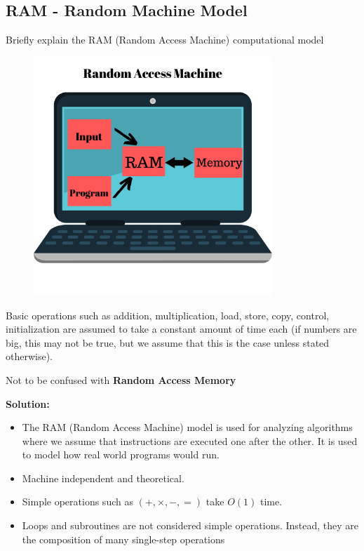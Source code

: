 \documentclass[11pt,fleqn]{book}
\begin{document}
\subsection{RAM - Random Machine Model}
\vspace{1em}
\begin{example}
Briefly explain the RAM (Random Access Machine) computational model
\end{example}
\begin{figure}[H]
    \centering
    \includegraphics[width=90mm]{Pictures/RAM_1.pdf}
\end{figure}
\vspace{1em} 
\begin{definition}
Basic operations such as addition, multiplication, load, store,
copy, control, initialization are assumed to take a constant
amount of time each (if numbers are big, this may not be true,
but we assume that this is the case unless stated otherwise).
\end{definition}
\begin{remark}
Not to be confused with \textbf{Random Access Memory} 
\end{remark}
\textbf{Solution:}
\begin{itemize}
    \item The RAM (Random Access Machine) model is used for analyzing algorithms where we assume  that instructions are executed one after the other. It is used to model how real world programs would run.
    \item Machine independent and theoretical.
    \item Simple operations such as $(+,\times, -, =)$ take $O(1)$ time.
    \item Loops and subroutines are not considered simple operations. Instead, they are the composition of many single-step operations
\end{itemize}
\end{document}
